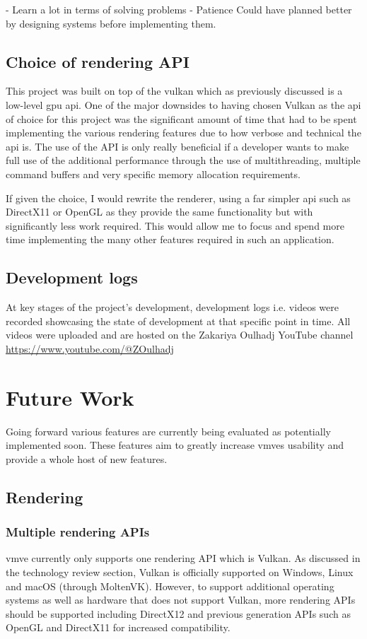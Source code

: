 \documentclass[11pt]{article}
\begin{document}
- Learn a lot in terms of solving problems
- Patience
Could have planned better by designing systems before implementing them.


\subsection{Choice of rendering API}
This project was built on top of the \gls*{vulkan} which as previously discussed
is a low-level \gls*{gpu} \gls*{api}. One of the major downsides to having
chosen Vulkan as the \gls*{api} of choice for this project was the significant
amount of time that had to be spent implementing the various rendering features
due to how verbose and technical the \gls*{api} is. The use of the API is only
really beneficial if a developer wants to make full use of the additional
performance through the use of multithreading, multiple command buffers and very
specific memory allocation requirements.

If given the choice, I would rewrite the renderer, using a far simpler \gls*{api}
such as DirectX11 or OpenGL as they provide the same functionality but with
significantly less work required. This would allow me to focus and spend more time 
implementing the many other features required in such an application.

\subsection{Development logs}
At key stages of the project's development, development logs i.e. videos were
recorded showcasing the state of development at that specific point in time. All
videos were uploaded and are hosted on the Zakariya Oulhadj YouTube channel
\url{https://www.youtube.com/@ZOulhadj}

\clearpage
\section{Future Work}
Going forward various features are currently being evaluated as potentially
implemented soon. These features aim to greatly increase \glspl*{vmve} usability
and provide a whole host of new features.

\subsection{Rendering}

\subsubsection{Multiple rendering APIs}
\gls*{vmve} currently only supports one rendering API which is Vulkan. As
discussed in the technology review section, Vulkan is officially supported on
Windows, Linux and macOS (through MoltenVK). However, to support additional
operating systems as well as hardware that does not support Vulkan, more
rendering APIs should be supported including DirectX12 and previous generation
APIs such as OpenGL and DirectX11 for increased compatibility.
\end{document}

